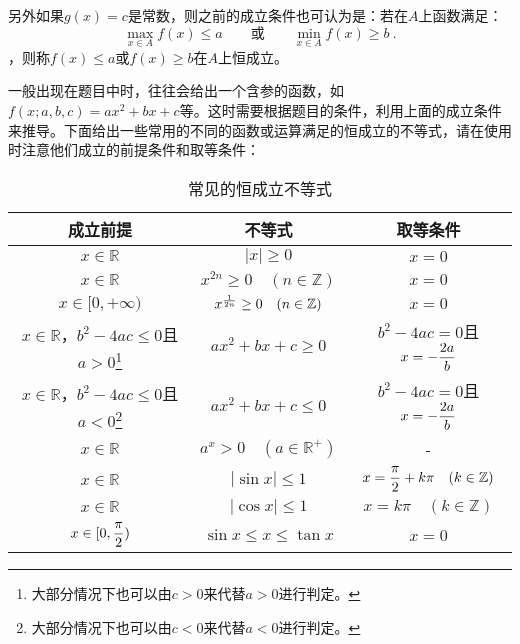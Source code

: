 另外如果$g(x)=c$是常数，则之前的成立条件也可认为是：若在$A$上函数满足：
\begin{equation}
\displaystyle\max_{x\in A} f(x)\leq a\qquad\text{或}\qquad\min_{x\in A} f(x)\geq b~.
\end{equation}
，则称$f(x)\leq a$或$f(x)\geq b$在$A$上恒成立。

一般出现在题目中时，往往会给出一个含参的函数，如$f(x;a,b,c)=ax^2+bx+c$等。这时需要根据题目的条件，利用上面的成立条件来推导。下面给出一些常用的不同的函数或运算满足的恒成立的不等式，请在使用时注意他们成立的前提条件和取等条件：
\begin{table}[ht]
\centering
\caption{常见的恒成立不等式}\label{tab_HsIden1}
\begin{tabular}{|c|c|c|}
\hline
成立前提 & 不等式 & 取等条件 \\
\hline
$x\in\mathbb{R}$&$|x|\geq0$&$x=0$ \\
\hline
$x\in\mathbb{R}$&$x^{2n}\geq0\quad(n\in\mathbb{Z})$&$x=0$\\
\hline
$x\in[0,+\infty)$&$x^{1\over2n}\geq0\quad(n\in\mathbb{Z})$&$x=0$\\
\hline
$x\in\mathbb{R}$，$b^2-4ac\leq0$且$a>0$\footnote{大部分情况下也可以由$c>0$来代替$a>0$进行判定。}&$ax^2+bx+c\geq0$&$b^2-4ac=0$且$\displaystyle x=-{2a\over b}$\\
\hline
$x\in\mathbb{R}$，$b^2-4ac\leq0$且$a<0$\footnote{大部分情况下也可以由$c<0$来代替$a<0$进行判定。}&$ax^2+bx+c\leq0$&$b^2-4ac=0$且$\displaystyle x=-{2a\over b}$\\
\hline
$x\in\mathbb{R}$&$a^x>0\quad(a\in\mathbb{R}^+)$&-\\
\hline
$x\in\mathbb{R}$&$|\sin x|\leq 1$&$\displaystyle x={\pi\over2}+k\pi\quad (k\in\mathbb{Z})$\\
\hline
$x\in\mathbb{R}$&$|\cos x|\leq 1$&$x=k\pi\quad (k\in\mathbb{Z})$\\
\hline
$\displaystyle x\in[0,{\pi\over2})$&$\sin x\leq x\leq\tan x$&$x=0$\\
\hline
\end{tabular}
\end{table}


